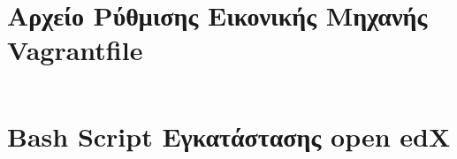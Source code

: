 \documentclass[12pt]{report}
\begin{document}
\begin{appendices}
\chapter{Αρχείο Ρύθμισης Εικονικής Μηχανής \textlatin{Vagrantfile}}\label{AppA}
\inputminted[linenos, fontsize=\scriptsize, breaklines, baselinestretch=1]{ruby}{sources/Vagrantfile}
\chapter{\textlatin{Bash Script} Εγκατάστασης \textlatin{open edX}}\label{AppB}
\inputminted[linenos, fontsize=\scriptsize, breaklines, baselinestretch=1]{bash}{sources/install_edx.sh}
\end{appendices}

\appendix



\end{document}
